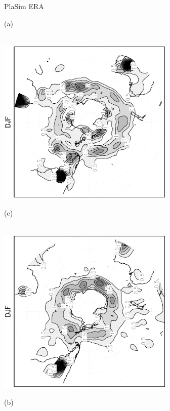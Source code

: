 \documentclass[12pt,a4paper,twoside,openright,headinclude,liststotoc,bibtotoc]{scrreprt}
\begin{document}
\begin{appendix}
\begin{figure}[c]
\hspace{3.8cm}PlaSim \vspace{0.2cm} \hspace{7.3cm} ERA \\
\parbox{8.5cm}{\hspace{0.95cm}\begin{scriptsize}(a)\end{scriptsize} \vspace{-0.5cm} \\
\includegraphics[height=8.0cm,angle=-90]
{eps/cyclgen_PLASIM_T21_45DJF_SH.eps}
}
\parbox{8.5cm}{\hspace{0.95cm}\begin{scriptsize}(c)\end{scriptsize} \vspace{-0.5cm} \\
\includegraphics[height=8.0cm,angle=-90]
{eps/cyclgen_ERA40_T21_45DJF_SH.eps}
}
\parbox{8.5cm}{\hspace{0.95cm}\begin{scriptsize}(b)\end{scriptsize} \vspace{-0.5cm} \\
}
\end{figure}
\end{appendix}
\end{document}
